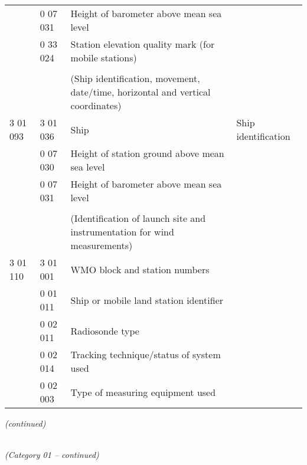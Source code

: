 \begin{longtable}[]{@{}llll@{}}
& 0 07 031 & Height of barometer above mean sea level &\tabularnewline
& 0 33 024 & Station elevation quality mark (for mobile stations) &\tabularnewline
& & &\tabularnewline
& & (Ship identification, movement, date/time, horizontal and vertical coordinates) &\tabularnewline
3 01 093 & 3 01 036 & Ship & Ship identification\tabularnewline
& 0 07 030 & Height of station ground above mean sea level &\tabularnewline
& 0 07 031 & Height of barometer above mean sea level &\tabularnewline
& & &\tabularnewline
& & (Identification of launch site and instrumentation for wind measurements) &\tabularnewline
3 01 110 & 3 01 001 & WMO block and station numbers &\tabularnewline
& 0 01 011 & Ship or mobile land station identifier &\tabularnewline
& 0 02 011 & Radiosonde type &\tabularnewline
& 0 02 014 & Tracking technique/status of system used &\tabularnewline
& 0 02 003 & Type of measuring equipment used &\tabularnewline
\bottomrule
\end{longtable}

\emph{(continued)}

\emph{\\
(Category 01 -- continued)}

